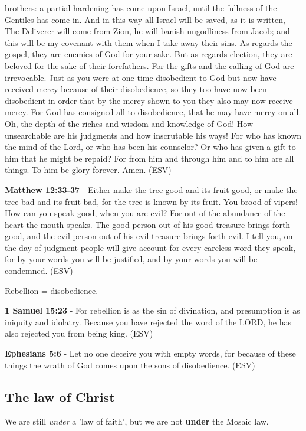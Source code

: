 \documentclass[11pt]{article}
\begin{document}
brothers: a partial hardening has come upon Israel, until the fullness of the Gentiles has come in. And in this way all Israel will be saved, as it is written, The Deliverer will come from Zion, he will banish ungodliness from Jacob; and this will be my covenant with them when I take away their sins. As regards the gospel, they are enemies of God for your sake. But as regards election, they are beloved for the sake of their forefathers. For the gifts and the calling of God are irrevocable. Just as you were at one time disobedient to God but now have received mercy because of their disobedience, so they too have now been disobedient in order that by the mercy shown to you they also may now receive mercy. For God has consigned all to disobedience, that he may have mercy on all. Oh, the depth of the riches and wisdom and knowledge of God! How unsearchable are his judgments and how inscrutable his ways! For who has known the mind of the Lord, or who has been his counselor? Or who has given a gift to him that he might be repaid? For from him and through him and to him are all things. To him be glory forever. Amen. (ESV)

\textbf{Matthew 12:33-37} - Either make the tree good and its fruit good, or make the tree bad and its fruit bad, for the tree is known by its fruit. You brood of vipers! How can you speak good, when you are evil? For out of the abundance of the heart the mouth speaks. The good person out of his good treasure brings forth good, and the evil person out of his evil treasure brings forth evil. I tell you, on the day of judgment people will give account for every careless word they speak, for by your words you will be justified, and by your words you will be condemned. (ESV)

Rebellion = disobedience.

\textbf{1 Samuel 15:23} - For rebellion is as the sin of divination, and presumption is as iniquity and idolatry. Because you have rejected the word of the LORD, he has also rejected you from being king. (ESV)

\textbf{Ephesians 5:6} - Let no one deceive you with empty words, for because of these things the wrath of God comes upon the sons of disobedience. (ESV)

\subsection{The law of Christ}
\label{sec:org6e83d6f}
We are still \emph{under} a 'law of faith', but we are not \textbf{under} the Mosaic law.
\end{document}

